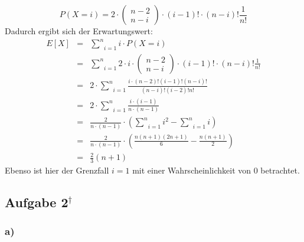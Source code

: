 \documentclass[11pt,a4paper,ngerman]{article}
\newcommand{\alex}{$^\dagger$}
\begin{document}
\begin{description}
        \[
            P(X=i) = 2 \cdot \begin{pmatrix} n - 2 \\ n-i \end{pmatrix} \cdot (i-1)! \cdot (n-i)! \frac{1}{n!}
        \]
        Dadurch ergibt sich der Erwartungswert:
        \[\begin{array}{rcl}
            E[X] &=& \underset{i=1}{\overset{n}{\sum}} i \cdot P(X=i)\\
                &=& \underset{i=1}{\overset{n}{\sum}} 2 \cdot i \cdot \begin{pmatrix} n - 2 \\ n - i \end{pmatrix} \cdot (i-1)! \cdot (n-i)! \frac{1}{n!}\\
                &=& 2 \cdot \underset{i=1}{\overset{n}{\sum}} \frac{ i \cdot (n-2)! (i-1)! (n-i)!} { (n-i)! (i - 2)!n!}\\
                &=& 2 \cdot \underset{i=1}{\overset{n}{\sum}} \frac{ i \cdot (i-1)} {n \cdot (n-1)}\\
                &=& \frac{2}{n \cdot (n-1)} \cdot \left( \underset{i=1}{\overset{n}{\sum}} i^2 - \underset{i=1}{\overset{n}{\sum}} i\right)\\
                &=& \frac{2}{n \cdot (n-1)} \cdot \left( \frac{n(n+1)(2 n+1)}{6} - \frac{n(n+1)}{2}\right)\\
                &=& \frac{2}{3} (n+1)
        \end{array}\]
        Ebenso ist hier der Grenzfall $i=1$ mit einer Wahrscheinlichkeit von $0$ betrachtet.
\end{description}

\subsection*{Aufgabe 2\alex}

\subsubsection*{a)}
\end{document}

